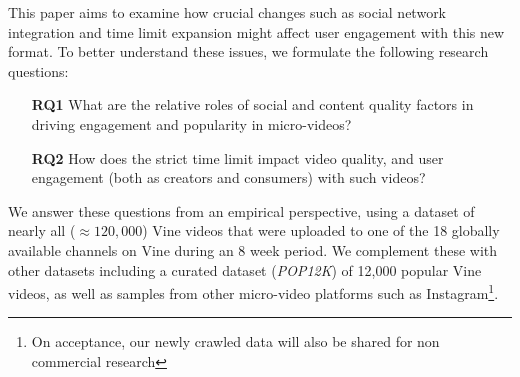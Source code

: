 This paper aims to examine how  crucial changes such as social network integration and time limit expansion might affect user engagement with this new format. 
To better understand these issues, we formulate the following research questions: 



\begin{itemize}
\item[\textbf{RQ1}] What are the relative roles of  social and content quality factors in driving engagement and popularity in micro-videos?
\item[\textbf{RQ2}] How does the strict time limit impact video quality, and user engagement (both as creators and consumers) with such videos? %
\end{itemize}

We answer these questions from an empirical perspective, using a dataset of nearly all ($\approx 120,000$) Vine videos that were uploaded to one of the 18 globally available channels on Vine during an 8 week period. We complement these with other datasets including a curated dataset (\emph{POP12K}) of 12,000 popular Vine videos, as well as samples from other micro-video platforms such as Instagram\footnote{On acceptance, our newly crawled data will also be shared  for non commercial research}. 
 
 
